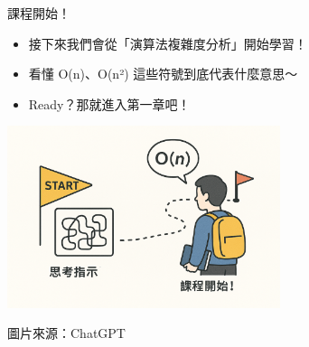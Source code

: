 \documentclass{beamer}
\begin{document}
\begin{frame}{課程開始！}
\begin{itemize}
    \item 接下來我們會從「演算法複雜度分析」開始學習！
    \item 看懂 O(n)、O(n²) 這些符號到底代表什麼意思～
    \item Ready？那就進入第一章吧！
\end{itemize}

\vspace{1em}
\begin{center}
    \includegraphics[width=0.6\textwidth]{images/next.png}
    
    {\tiny 圖片來源：ChatGPT}
\end{center}
\end{frame}
\end{document}
